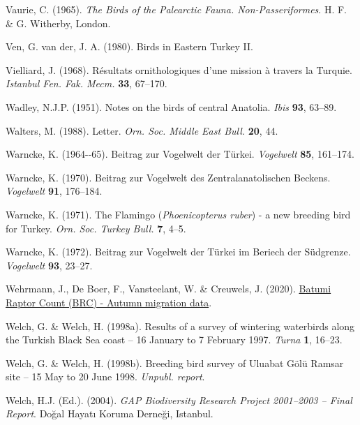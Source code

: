 \documentclass[
  a4paper,
  DIV=11,
  numbers=noendperiod]{scrreprt}
\newlength{\cslhangindent}
\newenvironment{CSLReferences}[2] %
 {\begin{list}{}{%
  \setlength{\itemindent}{0pt}
  \setlength{\leftmargin}{0pt}
  \setlength{\parsep}{0pt}
  \ifodd #1
   \setlength{\leftmargin}{\cslhangindent}
   \setlength{\itemindent}{-1\cslhangindent}
  \fi
  \setlength{\itemsep}{#2\baselineskip}}}
 {\end{list}}
\begin{document}
\begin{CSLReferences}{1}{1}
Vaurie, C. (1965). \emph{{The Birds of the Palearctic Fauna.
Non-Passeriformes}}. H. F. \& G. Witherby, London.

Ven, G. van der, J. A. (1980). {Birds in Eastern Turkey II}.

Vielliard, J. (1968). {Résultats ornithologiques d'une mission à travers
la Turquie}. \emph{Istanbul Fen. Fak. Mecm.} \textbf{33}, 67--170.

Wadley, N.J.P. (1951). {Notes on the birds of central Anatolia}.
\emph{Ibis} \textbf{93}, 63--89.

Walters, M. (1988). {Letter}. \emph{Orn. Soc. Middle East Bull.}
\textbf{20}, 44.

Warncke, K. (1964-\/-65). {Beitrag zur Vogelwelt der Türkei}.
\emph{Vogelwelt} \textbf{85}, 161--174.

Warncke, K. (1970). {Beitrag zur Vogelwelt des Zentralanatolischen
Beckens}. \emph{Vogelwelt} \textbf{91}, 176--184.

Warncke, K. (1971). {The Flamingo (\emph{Phoenicopterus ruber}) - a new
breeding bird for Turkey}. \emph{Orn. Soc. Turkey Bull.} \textbf{7},
4--5.

Warncke, K. (1972). {Beitrag zur Vogelwelt der Türkei im Beriech der
Südgrenze}. \emph{Vogelwelt} \textbf{93}, 23--27.

Wehrmann, J., De Boer, F., Vansteelant, W. \& Creuwels, J. (2020).
\href{https://doi.org/10.15468/UR0VNH}{{Batumi Raptor Count (BRC) -
Autumn migration data}}.

Welch, G. \& Welch, H. (1998a). {Results of a survey of wintering
waterbirds along the Turkish Black Sea coast -- 16 January to 7 February
1997}. \emph{Turna} \textbf{1}, 16--23.

Welch, G. \& Welch, H. (1998b). {Breeding bird survey of Uluabat Gölü
Ramsar site -- 15 May to 20 June 1998}. \emph{Unpubl. report}.

Welch, H.J. (Ed.). (2004). \emph{{GAP Biodiversity Research Project
2001--2003 -- Final Report}}. Doğal Hayatı Koruma Derneği, Istanbul.


\end{CSLReferences}
\end{document}
